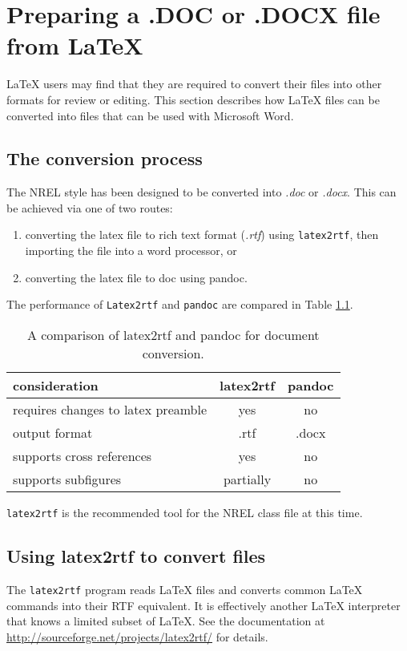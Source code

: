 \chapter{Preparing a .DOC or .DOCX file from LaTeX}\label{sec:latextodoc}
LaTeX users may find that they are required to convert their files into other formats for review or  editing. This section describes how LaTeX files can be converted into files that can be used with Microsoft Word.

\section{The conversion process} 
The NREL style has been designed to be converted into \emph{.doc} or \emph{.docx}. This can be achieved via one of two routes:
\begin{enumerate}
\item converting the latex file to rich text format (\emph{.rtf}) using \texttt{latex2rtf}, then importing the file into a word processor, or
\item converting the latex file to doc using pandoc.
\end{enumerate}

The performance of \texttt{Latex2rtf} and \texttt{pandoc} are compared in Table \ref{tab:conversioncomparison}.

\begin{table}[!h]
\centering
\caption{A comparison of latex2rtf and pandoc for document conversion.}\label{tab:conversioncomparison}
\begin{tabular}{lcc}
consideration & latex2rtf & pandoc \\\hline
requires changes to latex preamble & yes & no\\
output format & .rtf & .docx \\
supports cross references & yes & no\\
supports subfigures & partially & no\\
\end{tabular}
\end{table}

\texttt{latex2rtf} is the recommended tool for the NREL class file at this time.

\section{Using latex2rtf to convert files}
The \texttt{latex2rtf} program reads LaTeX files and converts common LaTeX commands into their RTF equivalent. It is effectively another LaTeX interpreter that knows a limited subset of LaTeX. See the documentation at \href{http://sourceforge.net/projects/latex2rtf/}{http://sourceforge.net/projects/latex2rtf/} for details.

